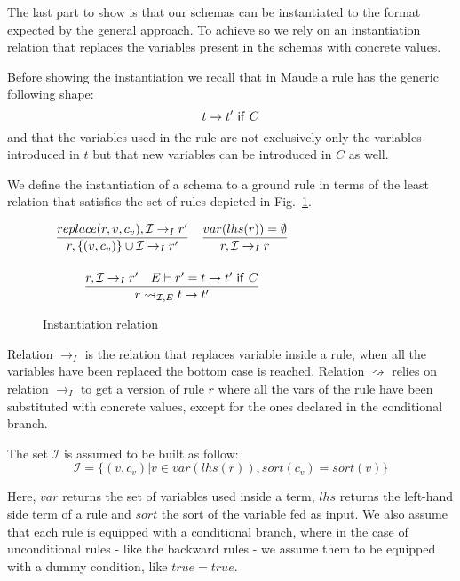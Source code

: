 \documentclass{article}[12pt,a4paper]
\theoremstyle{definition}
\begin{document}
The last part to show is that our schemas can be instantiated to the format
expected by the general approach. To achieve so we rely on an instantiation
relation that replaces the variables present in the schemas with concrete values.

Before showing the instantiation we recall that in Maude a rule has the generic
following shape:
\[t \rightarrow t'~\mathsf{if}~C\]
and that the variables used in the rule are not exclusively only the variables
introduced in $t$ but that new variables can be introduced in $C$ as well.

We define the instantiation of a schema to a ground rule in terms of the least
relation that satisfies the set of rules depicted in Fig.~\ref{fig:inst}.

\begin{figure}
  \centering
  $
  \begin{array}{c}
  \begin{array}{ll}
      \displaystyle
      \frac{replace(r,v,c_v),\mathcal{I}\rightarrow_I r'}
      {r, \{(v,c_v)\}\cup\mathcal{I} \rightarrow_I r'}
    &
      \displaystyle
      \frac{var(lhs(r))=\emptyset}
      {r,\mathcal{I} \rightarrow_I r}
  \end{array}\\[5ex]

  \begin{array}{c}
    \displaystyle
    \frac{r,\mathcal{I}\rightarrow_I r'~~~E\vdash r'=t\rightarrow t'~\ms{if}~C}
    {r \rightsquigarrow_{\mathcal{I},E} t\rightarrow t'}
  \end{array}
  \end{array}
  $
  \caption{Instantiation relation}
  \label{fig:inst}
\end{figure}

Relation $\rightarrow_I$ is the relation that replaces variable inside a rule,
when all the variables have been replaced the bottom case is reached. Relation
$\rightsquigarrow$ relies on relation $\rightarrow_I$ to get a version of rule $r$
where all the vars of the rule have been substituted with concrete values,
except for the ones declared in the conditional branch.

The set $\mathcal{I}$ is assumed to be built as follow:
\[\mathcal{I}=\{(v,c_v)|v\in var(lhs(r)), sort(c_v)= sort(v)\}\]

Here, $var$ returns the set of variables used inside a term, $lhs$ returns
the left-hand side term of a rule and $sort$ the sort of the variable fed as
input.
We also assume that each rule is equipped with a conditional branch, where in
the case of unconditional rules - like the backward rules - we assume them to be
equipped with a dummy condition, like $true = true$.
\end{document}
